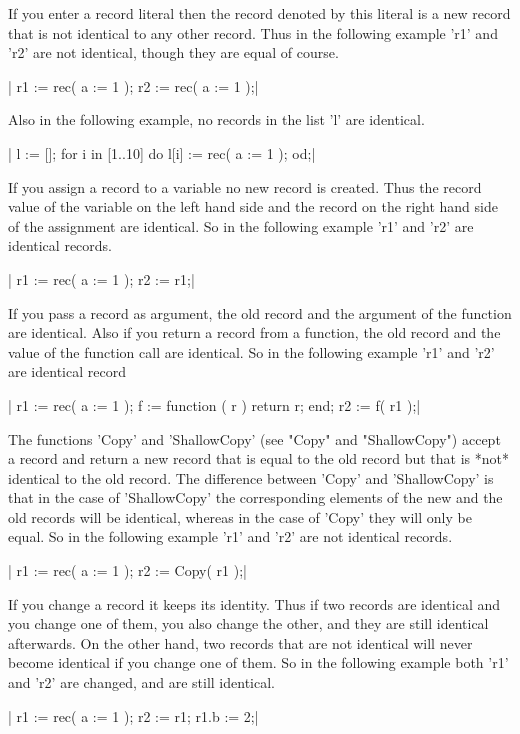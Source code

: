 If you enter a record literal then the record denoted  by this literal is
a new record  that is not  identical to any   other record.  Thus  in the
following example 'r1' and 'r2' are  not identical, though they are equal
of course.

|    r1 := rec( a := 1 );
    r2 := rec( a := 1 );|

Also in the following example, no records in the list 'l' are identical.

|    l := [];
    for i  in [1..10]  do
        l[i] := rec( a := 1 );
    od;|

If you assign a record to a variable no new record  is created.  Thus the
record value of the variable on the left hand side and  the record on the
right  hand side of the assignment   are identical.  So  in the following
example 'r1' and 'r2' are identical records.

|    r1 := rec( a := 1 );
    r2 := r1;|

If you pass a record as argument, the old record and  the argument of the
function are identical.  Also if you return a record from a function, the
old record and the value of  the function call  are identical.  So in the
following example 'r1' and 'r2' are identical record

|    r1 := rec( a := 1 );
    f := function ( r )  return r;  end;
    r2 := f( r1 );|

The  functions 'Copy'  and  'ShallowCopy' (see  "Copy" and "ShallowCopy")
accept a record and  return a new record that  is equal to the old record
but  that is *not* identical to  the old  record.  The difference between
'Copy' and  'ShallowCopy'  is that   in  the  case of  'ShallowCopy'  the
corresponding elements of the new and  the old records will be identical,
whereas in  the   case of  'Copy' they   will  only be  equal.  So in the
following example 'r1' and 'r2' are not identical records.

|    r1 := rec( a := 1 );
    r2 := Copy( r1 );|

If  you change a  record it keeps its identity.   Thus if two records are
identical and you change one of them, you also change the other, and they
are still identical afterwards.  On the  other hand, two records that are
not identical will never become identical if you  change one of them.  So
in the following  example both 'r1' and 'r2'  are changed,  and are still
identical.

|    r1 := rec( a := 1 );
    r2 := r1;
    r1.b := 2;|

%
%

